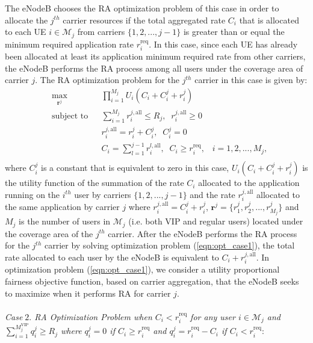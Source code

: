 \documentclass[journal]{IEEEtran} 				\IEEEoverridecommandlockouts 						\usepackage{amsmath,amssymb}
\begin{document}
The eNodeB chooses the RA optimization problem of this case in order to allocate the $j^{th}$ carrier resources if the total aggregated rate $C_i$ that is allocated to each UE $i \in \mathcal{M}_j$ from carriers $\{1,2,...,j-1\}$ is greater than or equal the minimum required application rate $r_i^{\text{req}}$. In this case, since each UE has already been allocated at least its application minimum required rate from other carriers, the eNodeB performs the RA process among all users under the coverage area of carrier $j$. The RA optimization problem for the $j^{th}$ carrier in this case is given by:
\begin{equation}\label{eqn:opt_case1}
\begin{aligned}
& \underset{\textbf{r}^j}{\text{max}}
& & \prod_{i=1}^{M_j}U_i(C_i+C_i^j+r_i^j) \\
& \text{subject to}
& & \sum_{i=1}^{M_j}r_i^{j,\text{all}} \leq R_j, \;\; r_i^{j,\text{all}} \geq 0\\
& & & r_i^{j,\text{all}}=r_i^j+C_i^j, \;\; C_i^j=0\\
& & & C_i=\sum_{l=1}^{j-1}r_i^{l,\text{all}}, \;\; C_i \geq r_i^{\text{req}}, \;\;\; i = 1,2, ...,M_j,\\
\end{aligned}
\end{equation}
where $C_i^j$ is a constant that is equivalent to zero in this case, $U_i(C_i+C_i^j+r_i^j)$ is the utility function of the summation of the rate $C_i$ allocated to the application running on the $i^{th}$ user by carriers $\{1,2,...,j-1\}$ and the rate $r_i^{j,\text{all}}$ allocated to the same application by carrier $j$ where $r_i^{j,\text{all}}=C_i^j+r_i^j$, $\textbf{r}^j =\{r_1^j,r_2^j,...,r_{M_j}^j\}$ and $M_j$ is the number of users in $\mathcal{M}_j$ (i.e. both VIP and regular users) located under the coverage area of the $j^{th}$ carrier. After the eNodeB performs the RA process for the $j^{th}$ carrier by solving optimization problem (\ref{eqn:opt_case1}), the total rate allocated to each user by the eNodeB is equivalent to $C_i+r_i^{j,\text{all}}$. In optimization problem (\ref{eqn:opt_case1}), we consider a utility proportional fairness objective function, based on carrier aggregation, that the eNodeB seeks to maximize when it performs RA for carrier $j$.\\
\\\textit{Case$\;2.$ RA Optimization Problem when $ C_i < r_i^{\text{req}}$ for any user $i \in \mathcal{M}_j$ and $\sum_{i=1}^{M_j^{\text{VIP}}} q_i^j \geq R_j$ where $q_i^j=0$ if $C_i \geq r_i^{\text{req}}$ and $q_i^j=r_i^{\text{req}}-C_i$ if $C_i < r_i^{\text{req}}$}:
\end{document}
